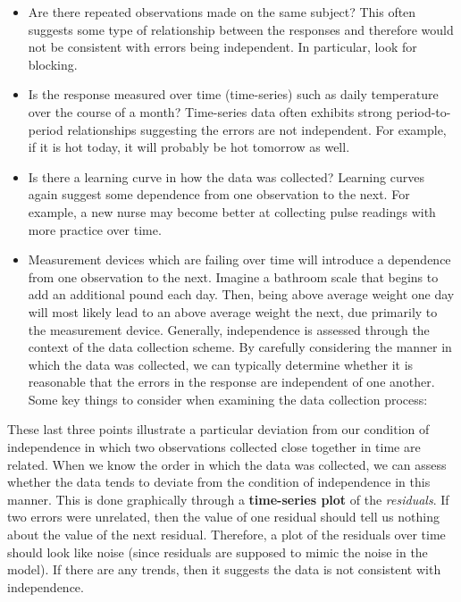 \documentclass[
  letterpaper,
  DIV=11,
  numbers=noendperiod]{scrreprt}
\providecommand{\tightlist}{%
  \setlength{\itemsep}{0pt}\setlength{\parskip}{0pt}}\usepackage{longtable,booktabs,array}
\theoremstyle{plain}
\theoremstyle{definition}
\theoremstyle{definition}
\theoremstyle{remark}
\begin{document}
\begin{itemize}
\tightlist
\item
  Are there repeated observations made on the same subject? This often
  suggests some type of relationship between the responses and therefore
  would not be consistent with errors being independent. In particular,
  look for blocking.
\item
  Is the response measured over time (time-series) such as daily
  temperature over the course of a month? Time-series data often
  exhibits strong period-to-period relationships suggesting the errors
  are not independent. For example, if it is hot today, it will probably
  be hot tomorrow as well.
\item
  Is there a learning curve in how the data was collected? Learning
  curves again suggest some dependence from one observation to the next.
  For example, a new nurse may become better at collecting pulse
  readings with more practice over time.
\item
  Measurement devices which are failing over time will introduce a
  dependence from one observation to the next. Imagine a bathroom scale
  that begins to add an additional pound each day. Then, being above
  average weight one day will most likely lead to an above average
  weight the next, due primarily to the measurement device. Generally,
  independence is assessed through the context of the data collection
  scheme. By carefully considering the manner in which the data was
  collected, we can typically determine whether it is reasonable that
  the errors in the response are independent of one another. Some key
  things to consider when examining the data collection process:
\end{itemize}

These last three points illustrate a particular deviation from our
condition of independence in which two observations collected close
together in time are related. When we know the order in which the data
was collected, we can assess whether the data tends to deviate from the
condition of independence in this manner. This is done graphically
through a \textbf{time-series plot} of the \emph{residuals}. If two
errors were unrelated, then the value of one residual should tell us
nothing about the value of the next residual. Therefore, a plot of the
residuals over time should look like noise (since residuals are supposed
to mimic the noise in the model). If there are any trends, then it
suggests the data is not consistent with independence.
\end{document}
